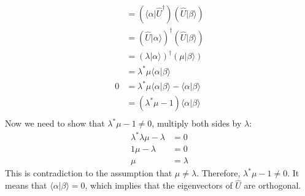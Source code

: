 \documentclass{article}
\begin{document}
\begin{enumerate}[label=(\alph*)]
\begin{align*}
        &= \left(\langle \alpha | \hat{U}^\dagger\right) \left( \hat{U} | \beta \rangle\right) \\
        &= \left(\hat{U} |\alpha\rangle\right)^\dagger \left(\hat{U} |\beta\rangle\right) \\
        &= \left(\lambda |\alpha\rangle\right)^\dagger \left(\mu |\beta\rangle\right) \\
        &= \lambda^* \mu \langle \alpha | \beta \rangle \\
        0 &= \lambda^* \mu \langle \alpha | \beta \rangle - \langle \alpha | \beta \rangle \\
        &= (\lambda^* \mu - 1) \langle \alpha | \beta \rangle \\
    \end{align*}
    Now we need to show that \(\lambda^* \mu - 1  \neq 0\), multiply both sides by \(\lambda\):
    \begin{align*}
        \lambda^* \lambda \mu - \lambda &= 0 \\
        1 \mu - \lambda &= 0 \\
        \mu &= \lambda
    \end{align*}
    This is contradiction to the assumption that \(\mu \neq \lambda\). Therefore, \(\lambda^* \mu - 1 \neq 0\). It means that \(\langle \alpha | \beta \rangle = 0\), which implies that the eigenvectors of \(\hat{U}\) are orthogonal.
\end{enumerate}
\end{document}

